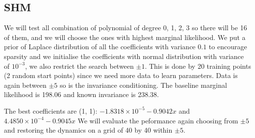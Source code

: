 \documentclass{statsmsc}
\begin{document}
\subsection{SHM}
We will test all combination of polynomial of degree 0, 1, 2, 3 so there will be 16 of them, and we will choose the ones with highest marginal likelihood.
We put a prior of Laplace distribution of all the coefficients with variance $0.1$ to encourage sparsity and we initialise the coefficients with normal distribution with variance of $10^{-3}$, we also restrict the search between $\pm 1$.
This is done by 20 training points (2 random start points) since we need more data to learn parameters.
Data is again between $\pm 5$ so is the invariance conditioning.
The baseline marginal likelihood is 198.06 and known invariance is 238.38.
\begin{flushleft}
\begin{table}[H]
  \caption{Log marginal likelihood for polynomial of different degree}
  \label{tab:shm_paramertised}
\end{table}
\end{flushleft}
The best coefficients are (1, 1):
$-1.8318\times 10^{-5}-0.9042x$
and
$4.4850\times 10^{-4}-0.9045x$
We will evaluate the peformance again choosing from $\pm 5$ and restoring the dynamics on a grid of 40 by 40 within $\pm 5$.
\end{document}
